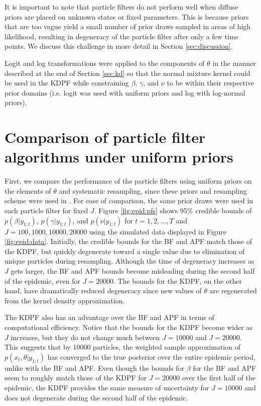 It is important to note that particle filters do not perform well when diffuse priors are placed on unknown states or fixed parameters. This is because priors that are too vague yield a small number of prior draws sampled in areas of high likelihood, resulting in degeneracy of the particle filter after only a few time points. We discuss this challenge in more detail in Section \ref{sec:discussion}.

Logit and log transformations were applied to the components of $\theta$ in the manner described at the end of Section \ref{sec:kd} so that the normal mixture kernel could be used in the KDPF while constraining $\beta$, $\gamma$, and $\nu$ to be within their respective prior domains (i.e. logit was used with uniform priors and log with log-normal priors).

\section{Comparison of particle filter algorithms under uniform priors} \label{sec:pfcomparison}

First, we compare the performance of the particle filters using uniform priors on the elements of $\theta$ and systematic resampling, since these priors and resampling scheme were used in \citet{skvortsov2012monitoring}. For ease of comparison, the same prior draws were used in each particle filter for fixed $J$. Figure \ref{fig:epid:pfs} shows 95\% credible bounds of $p(\beta|y_{1:t})$, $p(\gamma|y_{1:t})$, and $p(\nu|y_{1:t})$ for $t = 1,2,\ldots,T$ and $J = 100, 1000, 10000, 20000$ using the simulated data displayed in Figure \ref{fig:epid:data}. Initially, the credible bounds for the BF and APF match those of the KDPF, but quickly degenerate toward a single value due to elimination of unique particles during resampling. Although the time of degeneracy increases as $J$ gets larger, the BF and APF bounds become misleading during the second half of the epidemic, even for $J = 20000$. The bounds for the KDPF, on the other hand, have dramatically reduced degeneracy since new values of $\theta$ are regenerated from the kernel density approximation.

The KDPF also has an advantage over the BF and APF in terms of computational efficiency. Notice that the bounds for the KDPF become wider as $J$ increases, but they do not change much between $J = 10000$ and $J = 20000$. This suggests that by 10000 particles, the weighted sample approximation of $p(x_t,\theta|y_{1:t})$ has converged to the true posterior over the entire epidemic period, unlike with the BF and APF. Even though the bounds for $\beta$ for the BF and APF seem to roughly match those of the KDPF for $J = 20000$ over the first half of the epidemic, the KDPF provides the same measure of uncertainty for $J = 10000$ and does not degenerate during the second half of the epidemic.

